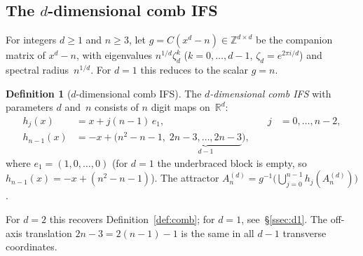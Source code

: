 \documentclass{amsart}
\theoremstyle{definition}
\newtheorem{definition}[theorem]{Definition}
\theoremstyle{remark}
\newcommand{\R}{\mathbb{R}}
\newcommand{\Z}{\mathbb{Z}}
\begin{document}
\subsection{The $d$-dimensional comb IFS}

For integers $d \ge 1$ and $n \ge 3$, let
$g = C(x^d - n) \in \Z^{d \times d}$
be the companion matrix of $x^d - n$, with eigenvalues
$n^{1/d}\zeta_d^k$ ($k = 0, \ldots, d{-}1$,
$\zeta_d = e^{2\pi i/d}$) and spectral radius~$n^{1/d}$.
For $d = 1$ this reduces to the scalar $g = n$.

\begin{definition}[$d$-dimensional comb IFS]\label{def:comb-d}
The \emph{$d$-dimensional comb IFS} with parameters $d$ and~$n$ consists
of $n$ digit maps on~$\R^d$:
\begin{equation}\label{eq:comb-maps-d}
\begin{aligned}
  h_j(x) &= x + j(n{-}1)\,e_1,
    &\quad j &= 0, \ldots, n{-}2, \\[2pt]
  h_{n-1}(x) &= -x + \bigl(n^2{-}n{-}1,\;
    \underbrace{2n{-}3, \ldots, 2n{-}3}_{d-1}\bigr),
\end{aligned}
\end{equation}
where $e_1 = (1, 0, \ldots, 0)$
(for $d = 1$ the underbraced block is empty,
so $h_{n-1}(x) = -x + (n^2{-}n{-}1)$).
The attractor
$A_n^{(d)} = g^{-1}\bigl(\bigcup_{j=0}^{n-1} h_j(A_n^{(d)})\bigr)$.
\end{definition}

For $d = 2$ this recovers Definition~\ref{def:comb};
for $d = 1$, see~\S\ref{ssec:d1}.
The off-axis translation $2n{-}3 = 2(n{-}1) - 1$ is
the same in all $d{-}1$ transverse coordinates.
\end{document}

